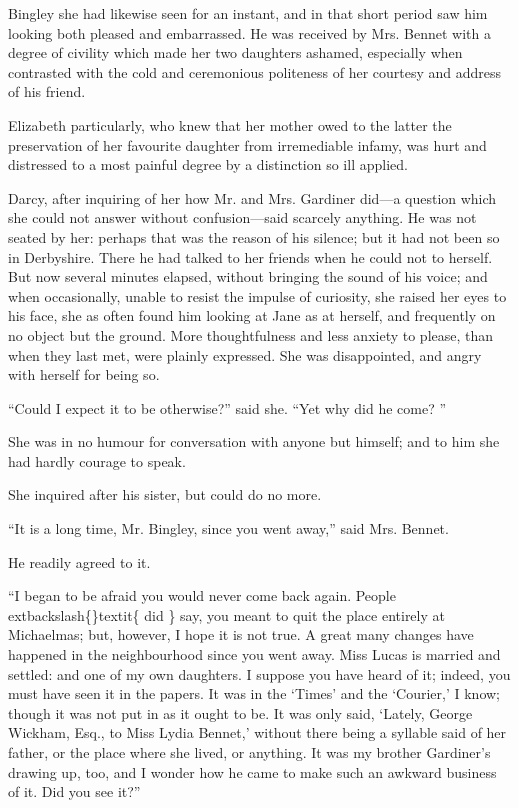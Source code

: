 \documentclass[10pt]{book}
\begin{document}
   Bingley she had likewise seen for an instant, and in that short period
saw him looking both pleased and embarrassed. He was received by Mrs.
Bennet with a degree of civility which made her two daughters ashamed,
especially when contrasted with the cold and ceremonious politeness of
her courtesy and address of his friend.
  

   Elizabeth particularly, who knew that her mother owed to the latter the
preservation of her favourite daughter from irremediable infamy, was
hurt and distressed to a most painful degree by a distinction so ill
applied.
  

   Darcy, after inquiring of her how Mr. and Mrs. Gardiner did—a question
which she could not answer without confusion—said scarcely anything. He
was not seated by her: perhaps that was the reason of his silence; but
it had not been so in Derbyshire. There he had talked to her friends
when he could not to herself. But now several minutes elapsed, without
bringing the sound of his voice; and when occasionally, unable to resist
the impulse of curiosity, she raised her eyes to his face, she as often
found him looking at Jane as at herself, and frequently on no object but
the ground. More thoughtfulness and less anxiety to please, than when
they last met, were plainly expressed. She was disappointed, and angry
with herself for being so.
  

   “Could I expect it to be otherwise?” said she. “Yet why did he come?
   ”
  

   She was in no humour for conversation with anyone but himself; and to
him she had hardly courage to speak.
  

   She inquired after his sister, but could do no more.
  

   “It is a long time, Mr. Bingley, since you went away,” said Mrs. Bennet.
  

   He readily agreed to it.
  

   “I began to be afraid you would never come back again. People
   	extbackslash\{\}textit\{
    did
   \}
   say,
you meant to quit the place entirely at Michaelmas; but, however, I hope
it is not true. A great many changes have happened in the neighbourhood
since you went away. Miss Lucas is married and settled: and one of my
own daughters. I suppose you have heard of it; indeed, you must have
seen it in the papers. It was in the ‘Times’ and the ‘Courier,’ I know;
though it was not put in as it ought to be. It was only said, ‘Lately,
George Wickham, Esq., to Miss Lydia Bennet,’ without there being a
syllable said of her father, or the place where she lived, or anything.
It was my brother Gardiner’s drawing up, too, and I wonder how he came
to make such an awkward business of it. Did you see it?”
  
\end{document}
